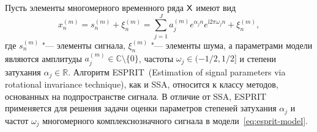 \documentclass[specialist,
  substylefile = spbu.rtx,
subf,href,colorlinks=true, 12pt]{disser}
\theoremstyle{plain}
\theoremstyle{definition}
\theoremstyle{remark}
\newtheorem{remark}{Замечание}[section]
\newcommand{\iu}{\mathrm{i}}
\begin{document}
Пусть элементы многомерного временного ряда $\mathsf{X}$ имеют вид
\begin{equation}
  \label{eq:esprit-model}
  x_n^{(m)} = s_n^{(m)} + \xi_n^{(m)} = \sum_{j=1}^{J} a_j^{(m)} e^{
  \alpha_j n }
  e^{\iu 2 \pi \omega_j n} + \xi_n^{(m)},
\end{equation}
где $s_n^{(m)}$ "--- элементы сигнала, $\xi_n^{(m)}$ "--- элементы
шума, а параметрами модели являются амплитуды
$a_j^{(m)} \in \mathbb{C}\setminus\{0\}$, частоты $\omega_j\in (-1/2,
1/2]$ и степени затухания $\alpha_j \in \mathbb{R}$.
Алгоритм ESPRIT~(Estimation of signal parameters via rotational
invariance technique),
как и SSA, относится к классу методов, основанных на подпространстве сигнала.
В отличие от SSA, ESPRIT применяется для решения задачи оценки параметров
степеней затухания $\alpha_j$ и частот $\omega_j$ многомерного
комплекснозначного сигнала в модели~\eqref{eq:esprit-model}.
\end{document}
